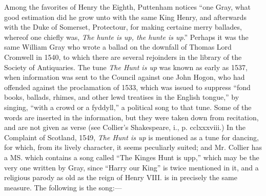 \pagebreak


Among the favorites of Henry the Eighth, Puttenham notices “one Gray,
what good estimation did he grow unto with the same King Henry, and afterwards
with the Duke of Somerset, Protectour, for making certaine merry ballades,
whereof one chiefly was, \textit{The hunte is up, the hunte is up}.” Perhaps it was the
same William Gray who wrote a ballad on the downfall of Thomas Lord Cromwell
in 1540, to which there are several rejoinders in the library of the Society of
Antiquaries. The tune \textit{The Hunt is up} was known as early as 1537, when
information was sent to the Council against one John Hogon, who had offended
against the proclamation of 1533, which was issued to suppress “fond books,
ballads, rhimes, and other lewd treatises in the English tongue,” by singing,
“with a crowd or a fyddyll,” a political song to that tune. Some of the words
are inserted in the information, but they were taken down from recitation, and are
not given as verse (see Collier’s Shakespeare, i., p. cclxxxviii.) In the Complaint
of Scotland, 1549, \textit{The Hunt is up} is mentioned as a tune for dancing, for which,
from its lively character, it seems peculiarly suited; and Mr. Collier has a MS.
which contains a song called “The Kinges Hunt is upp,” which may be the very
one written by Gray, since “Harry our King” is twice mentioned in it, and a
religious parody as old as the reign of Henry VIII. is in precisely the same
measure. The following is the song:—

\noindent\begin{minipage}{\textwidth}

\end{minipage}

